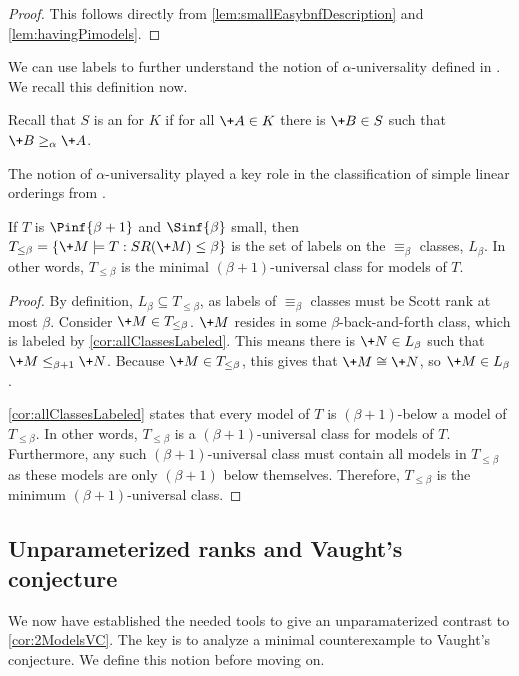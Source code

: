\documentclass{amsart}
\renewcommand{\-}{\text{-}}
\begin{document}
\begin{proof}
This follows directly from \cref{lem:smallEasybnfDescription} and \cref{lem:havingPimodels}.
\end{proof}

We can use labels to further understand the notion of $\alpha$-universality defined in \cite{GR24}.
We recall this definition now.
\begin{definition}
Recall that $S$ is an  for $K$ if for all $\+A\in K$ there is $\+B\in S$ such that $\+B\geq_{\alpha}\+A$.
\end{definition}
The notion of $\alpha$-universality played a key role in the classification of simple linear orderings from \cite{GR24}.

\begin{corollary}\label{cor:SRClassificationFromSmall}
  If $T$ is $\Pinf{\beta+1}$ and $\Sinf{\beta}$ small, then $T_{\leq\beta} = \{\+M\models T: SR(\+M)\leq \beta\}$ is the set of labels on the $\equiv_\beta$ classes, $L_\beta$. In other words, $T_{\leq\beta}$ is the minimal $(\beta+1)$-universal class for models of $T$.
\end{corollary}

\begin{proof}
By definition, $L_\beta\subseteq T_{\leq\beta}$, as labels of $\equiv_\beta$ classes must be Scott rank at most $\beta$.
Consider $\+M\in T_{\leq\beta}$.
$\+M$ resides in some $\beta$-back-and-forth class, which is labeled by \cref{cor:allClassesLabeled}.
This means there is $\+N\in L_\beta$ such that $\+M\leq_{\beta+1} \+N$.
Because $\+M\in T_{\leq\beta}$, this gives that $\+M\cong \+N$, so $\+M\in L_\beta$.

\cref{cor:allClassesLabeled} states that every model of $T$ is $(\beta+1)$-below a model of $T_{\leq\beta}$.
In other words, $T_{\leq\beta}$ is a $(\beta+1)$-universal class for models of $T$.
Furthermore, any such $(\beta+1)$-universal class must contain all models in $T_{\leq\beta}$ as these models are only $(\beta+1)$ below themselves.
Therefore, $T_{\leq\beta}$ is the minimum $(\beta+1)$-universal class.
\end{proof}

\subsection{Unparameterized ranks and Vaught's conjecture}
We now have established the needed tools to give an unparamaterized contrast to \cref{cor:2ModelsVC}.
The key is to analyze a minimal counterexample to Vaught's conjecture. 
We define this notion before moving on.
\end{document}
